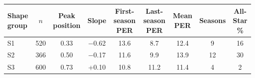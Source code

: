 \begin{tabular}{lcccccccc}\toprule
Shape group & $n$ & Peak position & Slope & First-season PER & Last-season PER & Mean PER & Seasons & All-Star \% \\ \midrule
S1 & 520 & 0.33 & $-$0.62 & 13.6 & 8.7 & 12.4 & 9 & 16 \\
S2 & 366 & 0.50 & $-$0.17 & 11.6 & 9.9 & 13.9 & 12 & 30 \\
S3 & 600 & 0.73 & +0.10 & 10.8 & 11.2 & 11.4 & 4 & 2 \\
\bottomrule\end{tabular}